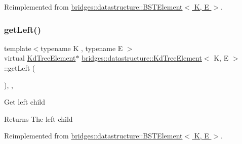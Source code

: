 Reimplemented from \hyperlink{classbridges_1_1datastructure_1_1_b_s_t_element_a8f962a01b6e0eff59abeee7768264fd9}{bridges\+::datastructure\+::\+B\+S\+T\+Element$<$ K, E $>$}.

\mbox{\label{classbridges_1_1datastructure_1_1_kd_tree_element_a875bfa2dfd88a7740f7bcd28a117c12a}} 
\subsubsection{\texorpdfstring{get\+Left()}{getLeft()}\hspace{0.1cm}{\footnotesize\ttfamily [1/2]}}
{\footnotesize\ttfamily template$<$typename K , typename E $>$ \\
virtual \hyperlink{classbridges_1_1datastructure_1_1_kd_tree_element}{Kd\+Tree\+Element}$\ast$ \hyperlink{classbridges_1_1datastructure_1_1_kd_tree_element}{bridges\+::datastructure\+::\+Kd\+Tree\+Element}$<$ K, E $>$\+::get\+Left (\begin{DoxyParamCaption}{ }\end{DoxyParamCaption})\hspace{0.3cm}{\ttfamily [inline]}, {\ttfamily [override]}, {\ttfamily [virtual]}}

Get left child \begin{DoxyReturn}{Returns}
The left child 
\end{DoxyReturn}


Reimplemented from \hyperlink{classbridges_1_1datastructure_1_1_b_s_t_element_af863c624691c11db26ae3b6d723d1f5c}{bridges\+::datastructure\+::\+B\+S\+T\+Element$<$ K, E $>$}.

\mbox{\label{classbridges_1_1datastructure_1_1_kd_tree_element_a653597918fbc6e31b84fcf8dbdf67122}} 
